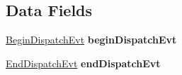 \subsection*{Data Fields}
\begin{DoxyCompactItemize}
\item 
\hyperlink{classRTSim_1_1BeginDispatchEvt}{Begin\+Dispatch\+Evt} {\bfseries begin\+Dispatch\+Evt}\hypertarget{classRTSim_1_1RTKernel_a1a060d88c57af90543c3083a511ded6a}{}\label{classRTSim_1_1RTKernel_a1a060d88c57af90543c3083a511ded6a}

\item 
\hyperlink{classRTSim_1_1EndDispatchEvt}{End\+Dispatch\+Evt} {\bfseries end\+Dispatch\+Evt}\hypertarget{classRTSim_1_1RTKernel_a546ea9db388ac378b1a76a986ba096d1}{}\label{classRTSim_1_1RTKernel_a546ea9db388ac378b1a76a986ba096d1}

\end{DoxyCompactItemize}
